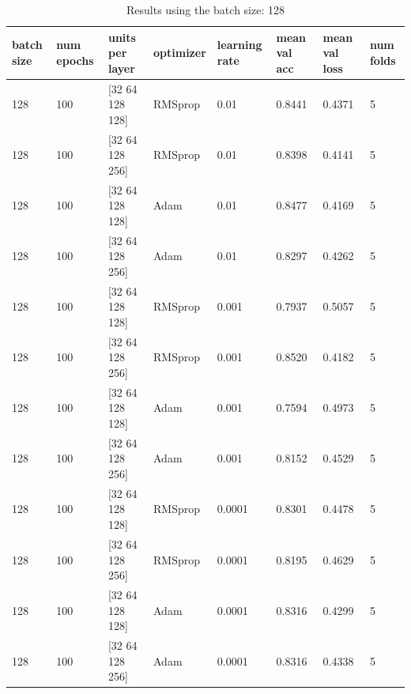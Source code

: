 \documentclass{book}
\begin{document}
            \begin{table}
                \begin{center}
                    \begin{tabular}{m{1cm}m{1cm}m{2.5cm}m{1.3cm}m{1cm}m{2cm}m{2cm}m{1cm}}
                        \midrule
                        batch size	& num epochs	& units per layer	& optimizer	& learning rate	& mean val acc	& mean val loss	& num folds \\
                        \midrule
                        128	& 100	& [32  64  128  128]	& RMSprop	& 0.01	& 0.8441 & 0.4371 & 5 \\
                        \midrule
                        128	& 100	& [32  64  128  256]	& RMSprop	& 0.01	& 0.8398 & 0.4141 & 5 \\
                        \midrule
                        128	& 100	& [32  64  128  128]	& Adam	& 0.01	& 0.8477 & 0.4169 & 5 \\
                        \midrule
                        128	& 100	& [32  64  128  256]	& Adam	& 0.01	& 0.8297 & 0.4262 & 5 \\
                        \midrule
                        128	& 100	& [32  64  128  128]	& RMSprop	& 0.001	& 0.7937 & 0.5057 & 5 \\
                        \midrule
                        128	& 100	& [32  64  128  256]	& RMSprop	& 0.001	& 0.8520 & 0.4182 & 5 \\
                        \midrule
                        128	& 100	& [32  64  128  128]	& Adam	& 0.001	& 0.7594 & 0.4973 & 5 \\
                        \midrule
                        128	& 100	& [32  64  128  256]	& Adam	& 0.001	& 0.8152 & 0.4529 & 5 \\
                        \midrule
                        128	& 100	& [32  64  128  128]	& RMSprop	& 0.0001	& 0.8301 & 0.4478 & 5 \\
                        \midrule
                        128	& 100	& [32  64  128  256]	& RMSprop	& 0.0001	& 0.8195 & 0.4629 & 5 \\
                        \midrule
                        128	& 100	& [32  64  128  128]	& Adam	& 0.0001	& 0.8316 & 0.4299 & 5 \\
                        \midrule
                        128	& 100	& [32  64  128  256]	& Adam	& 0.0001	& 0.8316 & 0.4338 & 5 \\
                        \midrule
                    \end{tabular}
                \end{center}
                \caption{\label{tab:results}Results using the batch size: 128}
            \end{table}
\end{document}
